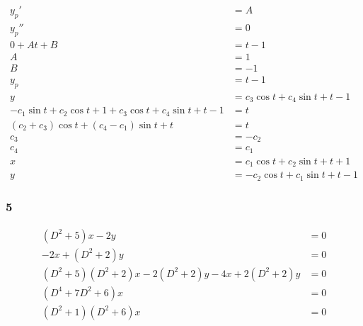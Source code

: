 \documentclass{article}
\begin{document}
\begin{align*}
  y_p'                                                           & = A                                \\
  y_p''                                                          & = 0                                \\
  0 + A t + B                                                    & = t - 1                            \\
  A                                                              & = 1                                \\
  B                                                              & = -1                               \\
  y_p                                                            & = t - 1                            \\
  y                                                              & = c_3 \cos t + c_4 \sin t + t - 1  \\
  -c_1 \sin t + c_2 \cos t + 1 + c_3 \cos t + c_4 \sin t + t - 1 & = t                                \\
  (c_2 + c_3) \cos t + (c_4 - c_1) \sin t + t                    & = t                                \\
  c_3                                                            & = -c_2                             \\
  c_4                                                            & = c_1                              \\
  x                                                              & = c_1 \cos t + c_2 \sin t + t + 1  \\
  y                                                              & = -c_2 \cos t + c_1 \sin t + t - 1
\end{align*}

\subsubsection{5}

\begin{align*}
  (D^2 + 5) x - 2 y                                          & = 0 \\
  -2 x + (D^2 + 2) y                                         & = 0 \\
  (D^2 + 5)(D^2 + 2) x - 2 (D^2 + 2) y - 4 x + 2 (D^2 + 2) y & = 0 \\
  (D^4 + 7 D^2 + 6) x                                        & = 0 \\
  (D^2 + 1) (D^2 + 6) x                                      & = 0
\end{align*}
\end{document}
